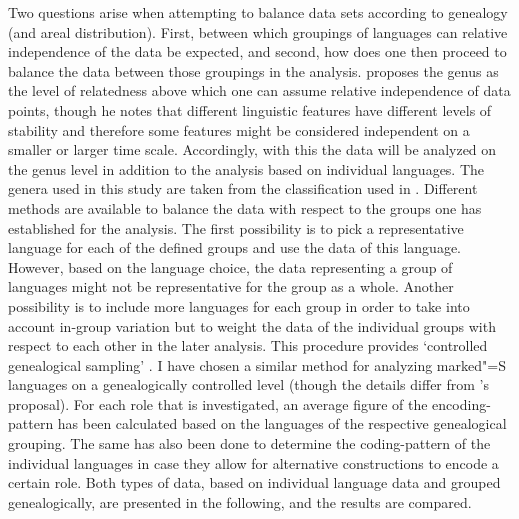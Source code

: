 \enlargethispage{\baselineskip}
Two questions arise when attempting to balance data sets according to genealogy (and areal distribution).
First, between which groupings of languages can relative independence of the data be expected, and second, how does one then proceed to balance the data between those groupings in the analysis.
\citet[267]{Dryer:1989} proposes the genus as the level of relatedness above which one can assume relative independence of data points, though he notes that different linguistic features have different levels of stability and therefore some features might be considered independent on a smaller or larger time scale. 
Accordingly, with this the data will be analyzed on the genus level in addition to the analysis based on individual languages.
The genera used in this study are taken from the classification used in \citet{WALS}. 
Different methods are available to balance the data with respect to the groups one has established for the analysis. 
The first possibility is to pick a representative language for each of the defined groups and use the data of this language. 
However, based on the language choice, the data representing a group of languages might not be representative for the group as a whole.
Another possibility is to include more languages for each group in order to take into account in-group variation but to weight the data of the individual groups with respect to each other in the later analysis. This procedure provides `controlled genealogical sampling' \citep{Bickel.samp}. 
I have chosen a similar method for analyzing marked"=S languages on a genealogically controlled level (though the details differ from \citeauthor{Bickel.samp}'s proposal). 
For each role that is investigated, an average figure of the encoding-pattern has been calculated based on the languages of the respective genealogical grouping. 
The same has also been done to determine the coding-pattern of the individual languages in case they allow for alternative constructions to encode a certain role. 
Both types of data, based on individual language data and grouped genealogically, are presented in the following, and the results are compared.
 
